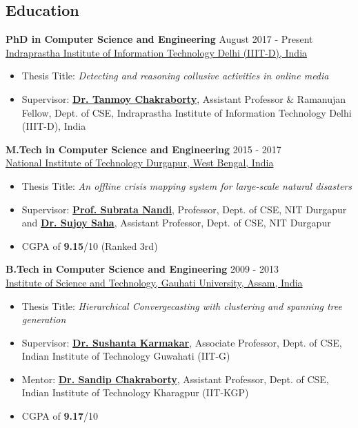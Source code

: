 \documentclass[margin, centered]{res}
\begin{document}
\begin{resume}
\section{Education}
\textbf{PhD in Computer Science and Engineering} \hfill August 2017 - Present \\
\href{http://www.iiitd.ac.in/}{Indraprastha Institute of Information Technology Delhi (IIIT-D), India}
\begin{itemize}
 \item Thesis Title: \textit{Detecting and reasoning collusive activities in online media}
 \item Supervisor: \href{https://sites.google.com/site/tanmoychakra88/}{\textbf{Dr. Tanmoy Chakraborty}}, Assistant Professor \& Ramanujan Fellow, Dept. of CSE, Indraprastha Institute of Information Technology Delhi (IIIT-D), India
\end{itemize}
\textbf{M.Tech in Computer Science and Engineering} \hfill 2015 - 2017 \\
\href{http://www.nitdgp.ac.in/}{National Institute of Technology Durgapur, West Bengal, India}
\begin{itemize}
 \item Thesis Title: \textit{An offline crisis mapping system for large-scale natural disasters}
 \item Supervisor: \href{http://www.nitdgp.ac.in/cse/s_nandi/s_nandi.php}{\textbf{Prof. Subrata Nandi}}, Professor, Dept. of CSE, NIT Durgapur and \href{http://www.nitdgp.ac.in/cse/s_saha/s_saha.php}{\textbf{Dr. Sujoy Saha}}, Assistant Professor, Dept. of CSE, NIT Durgapur
 \item CGPA of \textbf{9.15}/10 (Ranked 3rd)
\end{itemize}
\textbf{B.Tech in Computer Science and Engineering} \hfill 2009 - 2013 \\
\href{http://www.gauhati.ac.in/}{Institute of Science and Technology, Gauhati University, Assam, India}
\begin{itemize}
 \item Thesis Title: \textit{Hierarchical Convergecasting with clustering and spanning tree generation}
 \item Supervisor: \href{https://www.iitg.ac.in/sushantak/}{\textbf{Dr. Sushanta Karmakar}}, Associate Professor, Dept. of CSE, Indian Institute of Technology Guwahati (IIT-G)
 \item Mentor: \href{http://cse.iitkgp.ac.in/~sandipc/}{\textbf{Dr. Sandip Chakraborty}}, Assistant Professor, Dept. of CSE, Indian Institute of Technology Kharagpur (IIT-KGP)
 \item CGPA of \textbf{9.17}/10
\end{itemize}
 



\end{resume}
\end{document}
